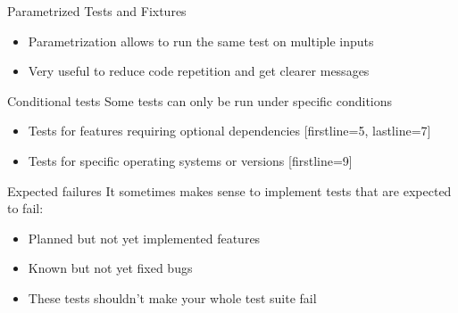 \begin{frame}[c]{Parametrized Tests and Fixtures}
  \begin{itemize}
    \item Parametrization allows to run the same test on multiple inputs
    \item Very useful to reduce code repetition and get clearer messages
  \end{itemize}

\end{frame}


\begin{frame}[c, fragile]{Conditional tests}
  Some tests can only be run under specific conditions
    \begin{itemize}
      \item Tests for features requiring optional dependencies
        [firstline=5, lastline=7]
      \item Tests for specific operating systems or versions
        [firstline=9]
    \end{itemize}
\end{frame}

\begin{frame}[c, fragile]{Expected failures}
  It sometimes makes sense to implement tests that are expected to fail:
  \begin{itemize}
    \item Planned but not yet implemented features
    \item Known but not yet fixed bugs
    \item These tests shouldn't make your whole test suite fail
  \end{itemize}

\end{frame}

